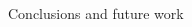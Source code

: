 {\begin{frame}{Conclusions and future work}
\begin{columns}
\begin{column}{.3\linewidth}
    \end{column}
  \end{columns}

\end{frame}
}


%
%
%
